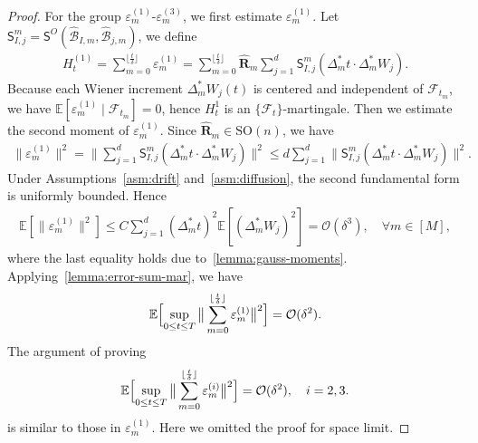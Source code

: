 \documentclass[11pt, a4paper, onecolumn]{article}
\newcommand{\SOn}{\mathrm{SO}(n)}
\newcommand{\E}{\mathbb{E}}
\newcommand{\m}{m}
\newcommand{\SSO}{\nm S^{O}}
\newcommand{\bfR}{\mathbf{R}}
\newcommand{\B}{\mathcal{B}}
\newcommand{\hatB}{\widehat{\B}}
\newcommand{\hatR}{\widehat{\bfR}}
\newcommand{\nm}[1]{\mathsf{#1}}
\newcommand{\calO}{\mathcal{O}}
\newcommand{\hBIms}{{\hatB_{I,\m}}}
\newcommand{\hBjms}{{\hatB_{j,\m}}}
\newcommand{\Dms}{{\Delta^{*}_{m}}}
\newcommand{\sumub}{{\lfloor \frac{t}{\delta} \rfloor}}
\newcommand{\ermn}[1]{\varepsilon_m^{(#1)}}
\newcommand{\EsupN}[1]{\E\Bigl[ \sup_{0 \le t\le T} \big\| \sum_{m=0}^{\sumub} #1 \big\|^2 \Bigr]}
\begin{document}
\begin{appendices}
\begin{proof}
   For the group $\ermn{1}$-$\ermn{3}$, we first estimate $\ermn{1}$. Let $\nm S^m_{I,j} = \SSO(\hBIms, \hBjms)$, we define
\begin{align*}
    H_t^{(1)} = \sum_{m=0}^{\sumub}\ermn{1}= \sum_{m=0}^{\sumub}\hatR_m\sum_{j=1}^d \nm S^m_{I,j} (\Dms t \cdot \Dms W_j).
\end{align*}
Because each Wiener increment $\Dms W_{j}(t)$ is centered and independent of $\mathcal F_{t_{m}}$, we have
$\mathbb E[\ermn{1}\mid\mathcal F_{t_m}]=0$, hence $H_{t}^{1}$ is an $\{\mathcal F_{t}\}$-martingale.
Then we estimate the second moment of $\ermn{1}$. Since $\hatR_{m}\in\SOn$, we have
\begin{align*}
     \|\ermn{1}\|^2 = \|\sum_{j=1}^d \nm S^m_{I,j} (\Dms t \cdot \Dms W_j)\|^2 \le d \sum_{j=1}^d \|\nm S^m_{I,j} (\Dms t \cdot \Dms W_j)\|^2.
\end{align*}
Under Assumptions~\ref{asm:drift} and~\ref{asm:diffusion}, the second fundamental form is uniformly bounded. Hence
\begin{align*}
    \E [\|\ermn{1}\|^2] \le C \sum_{j=1}^d (\Dms t)^2 \E[(\Dms W_j)^2] = \calO(\delta^3), \quad \forall m\in[M],
\end{align*}
where the last equality holds due to~\cref{lemma:gauss-moments}. Applying~\cref{lemma:error-sum-mar}, we have
\begin{align*}
     \EsupN{\ermn{1}} = \calO(\delta^2).
\end{align*}
The argument of proving 
\begin{align*}
     \EsupN{\ermn{i}} = \calO(\delta^2), \quad  i=2,3.
\end{align*}
is similar to those in $\ermn{1}$. Here we omitted the proof for space limit.


\end{proof}
\end{appendices}
\end{document}
